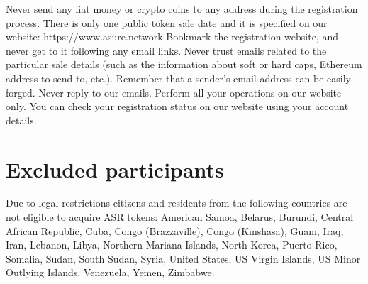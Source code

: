 Never send any fiat money or crypto coins to any address during the registration process. There is only one public token sale date and it is specified on our website: https://www.asure.network Bookmark the registration website, and never get to it following any email links.
Never trust emails related to the particular sale details (such as the information about soft or hard caps, Ethereum address to send to, etc.). Remember that a sender’s email address can be easily forged.
Never reply to our emails. Perform all your operations on our website only. You can check your registration status on our website using your account details.


\section{Excluded participants}
Due to legal restrictions citizens and residents from the following countries are not eligible to acquire ASR tokens: American Samoa, Belarus, Burundi, Central African Republic, Cuba, Congo (Brazzaville), Congo (Kinshasa), Guam, Iraq, Iran, Lebanon, Libya, Northern Mariana Islands, North Korea, Puerto Rico, Somalia, Sudan, South Sudan, Syria, United States, US Virgin Islands, US Minor Outlying Islands, Venezuela, Yemen, Zimbabwe.
